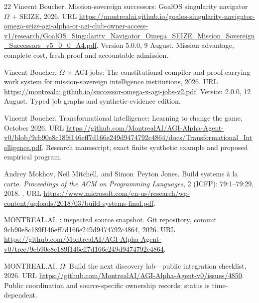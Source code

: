 \documentclass[11pt]{article}
\begin{document}
\begin{thebibliography}{22}
Vincent Boucher.
\newblock Mission-sovereign successors: {GoalOS} singularity navigator
  {$\Omega$} + {SEIZE}, 2026{}.
\newblock URL
  \url{https://montrealai.github.io/goalos-singularity-navigator-omega-seize-agi-alpha-or-agi-club-owner-access-v1/research/GoalOS_Singularity_Navigator_Omega_SEIZE_Mission_Sovereign_Successors_v5_0_0_A4.pdf}.
\newblock Version 5.0.0, 9 August. Mission advantage, complete cost, fresh
  proof and accountable admission.

Vincent Boucher.
 {$\Omega$} {$\times$} {AGI} jobs: The constitutional
  compiler and proof-carrying work system for mission-sovereign intelligence
  institutions, 2026{}.
\newblock URL
  \url{https://montrealai.github.io/successor-omega-x-agi-jobs-v2.pdf}.
\newblock Version 2.0.0, 12 August. Typed job graphs and synthetic-evidence
  edition.

Vincent Boucher.
\newblock Transformational intelligence: Learning to change the game, October
  2026{}.
\newblock URL
  \url{https://github.com/MontrealAI/AGI-Alpha-Agent-v0/blob/9cb90e8c189f146eff7d166e249d9474792c4864/docs/Transformational_Intelligence.pdf}.
\newblock Research manuscript; exact finite synthetic example and proposed
  empirical program.

Andrey Mokhov, Neil Mitchell, and Simon~Peyton Jones.
\newblock Build systems {\`a} la carte.
\newblock \emph{Proceedings of the ACM on Programming Languages}, 2
  (ICFP): 79:1--79:29, 2018.
\newblock {}.
\newblock URL
  \url{https://www.microsoft.com/en-us/research/wp-content/uploads/2018/03/build-systems-final.pdf}.

{MONTREAL.AI}.
: inspected source snapshot.
\newblock Git repository, commit 9cb90e8c189f146eff7d166e249d9474792c4864,
  2026{}.
\newblock URL
  \url{https://github.com/MontrealAI/AGI-Alpha-Agent-v0/tree/9cb90e8c189f146eff7d166e249d9474792c4864}.

{MONTREAL.AI}.
 {$\Omega$}: Build the next discovery lab---public
  integration checklist, 2026{}.
\newblock URL
  \url{https://github.com/MontrealAI/AGI-Alpha-Agent-v0/issues/4850}.
\newblock Public coordination and source-specific ownership records; status is
  time-dependent.


\end{thebibliography}
\end{document}

